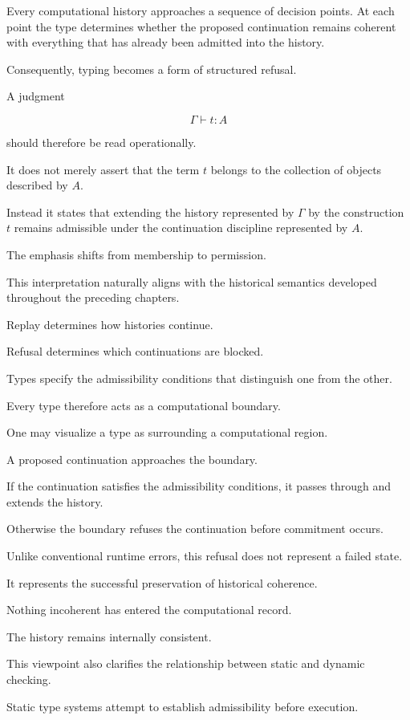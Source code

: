 \documentclass[12pt,oneside]{article}
\theoremstyle{definition}
\theoremstyle{remark}
\begin{document}
Every computational history approaches a sequence of decision points. At each
point the type determines whether the proposed continuation remains coherent
with everything that has already been admitted into the history.

Consequently, typing becomes a form of structured refusal.

A judgment

\[
\Gamma \vdash t : A
\]

should therefore be read operationally.

It does not merely assert that the term \(t\) belongs to the collection of
objects described by \(A\).

Instead it states that extending the history represented by \(\Gamma\) by the
construction \(t\) remains admissible under the continuation discipline
represented by \(A\).

The emphasis shifts from membership to permission.

This interpretation naturally aligns with the historical semantics developed
throughout the preceding chapters.

Replay determines how histories continue.

Refusal determines which continuations are blocked.

Types specify the admissibility conditions that distinguish one from the
other.

Every type therefore acts as a computational boundary.

One may visualize a type as surrounding a computational region.

A proposed continuation approaches the boundary.

If the continuation satisfies the admissibility conditions, it passes through
and extends the history.

Otherwise the boundary refuses the continuation before commitment occurs.

Unlike conventional runtime errors, this refusal does not represent a failed
state.

It represents the successful preservation of historical coherence.

Nothing incoherent has entered the computational record.

The history remains internally consistent.

This viewpoint also clarifies the relationship between static and dynamic
checking.

Static type systems attempt to establish admissibility before execution.
\end{document}
